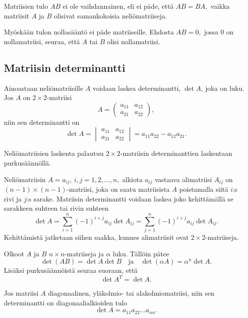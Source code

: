 \documentclass[a4paper, 12pt]{article}
\theoremstyle{remark}
\theoremstyle{definition}
\begin{document}
\begin{maar}
\begin{huom} Matriisien tulo $AB$ ei ole vaihdannainen, eli ei päde, että $AB=BA,$ vaikka matriisit $A$ ja $B$ olisivat samankokoisia neliömatriiseja.

Myöskään tulon nollasääntö ei päde matriiseille. Ehdosta $AB=0,$ jossa $0$ on nollamatriisi,  seuraa, että $A$ tai $B$ olisi nollamatriisi.
\end{huom}
\end{maar}

\clearpage
\subsection{Matriisin determinantti}
Ainoastaan neliömatriisille $A$ voidaan laskea determinantti, $\det A$, joka on luku. Jos $A$ on $2\times 2$-matriisi
$$
A=\begin{pmatrix}
a_{11} & a_{12}\\
a_{21}& a_{22}
\end{pmatrix},
$$
niin sen determinantti on
$$
\det A=\begin{vmatrix}
a_{11} & a_{12}\\
a_{21}& a_{22}
\end{vmatrix}=a_{11}a_{22}-a_{12}a_{21}.
$$

Neliömatriisien laskenta palautuu $2\times 2$-matriisin determinanttien laskentaan purkusäännöllä. 

\begin{maar} Neliömatriisin $A=a_{ij}, \ i, j=1, 2, \ldots, n,$ alkiota $a_{ij}$ vastaava alimatriisi	$A_{ij}$ on $(n-1)\times(n-1)$-matriisi, joka on saatu matriisista $A$ poistamalla siitä $i$:s rivi ja $j$:s sarake. Matriisin determinantti voidaan laskea joko kehittämällä se sarakkeen suhteen tai rivin suhteen
$$
\det A=\sum_{i=1}^n (-1)^{i+j} a_{ij}\det A_{ij}=\sum_{j=1}^n (-1)^{i+j} a_{ij}\det A_{ij}.
$$
Kehittämistä jatketaan siihen saakka, kunnes alimatriisit ovat $2\times 2$-matriiseja.
\end{maar}

\begin{lause}
Olkoot $A$ ja $B$ $n\times n$-matriiseja ja $\alpha$ luku. Tällöin pätee
$$
\det(AB)=\det A\det B\quad\text{ja}\quad \det (\alpha A)=\alpha^n\det A.
$$
Lisäksi purkusäännöistä seuraa suoraan, että
$$
\det A^T=\det A.
$$

Jos matriisi $A$ diagonaalinen, yläkolmio- tai alakolmiomatriisi, niin sen determinantti on diagonaalialkioiden tulo
$$
\det A=a_{11}a_{22}\ldots a_{nn}.
$$

\end{lause}
\end{document}
